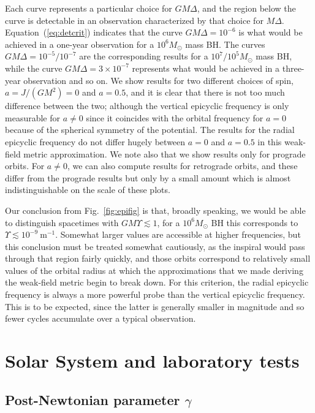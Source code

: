 \documentclass[aps,prd,amsfonts,amssymb,amsmath,nofootinbib,reprint,showpacs]{revtex4-1}
\newcommand{\eqnref}[1]{(\ref{eq:#1})}
\newcommand{\figref}[1]{Fig.\ \ref{fig:#1}}
\newcommand{\units}[1]{\ensuremath{~\mathrm{#1}}}
\begin{document}
Each curve represents a particular choice for $GM\Delta$, and the region below the curve is detectable in an observation characterized by that choice for $M\Delta$. Equation~\eqnref{detcrit} indicates that the curve $GM\Delta = 10^{-6}$ is what would be achieved in a one-year observation for a $10^6M_\odot$ mass BH. The curves $GM\Delta = 10^{-5}/10^{-7}$ are the corresponding results for a $10^7/10^5M_\odot$ mass BH, while the curve $GM\Delta = 3\times10^{-7}$ represents what would be achieved in a three-year observation and so on. We show results for two different choices of spin, $a = J/(GM^2) = 0$ and $a=0.5$, and it is clear that there is not too much difference between the two; although the vertical epicyclic frequency is only measurable for $a \neq 0$ since it coincides with the orbital frequency for $a = 0$ because of the spherical symmetry of the potential. The results for the radial epicyclic frequency do not differ hugely between $a = 0$ and $a = 0.5$ in this weak-field metric approximation. We note also that we show results only for prograde orbits. For $a \neq 0$, we can also compute results for retrograde orbits, and these differ from the prograde results but only by a small amount which is almost indistinguishable on the scale of these plots.

Our conclusion from \figref{epifig} is that, broadly speaking, we would be able to distinguish spacetimes with $GM\Upsilon \lesssim 1 $, for a $10^6 M_\odot$ BH this corresponds to $\Upsilon \lesssim 10^{-9}\units{m^{-1}}$. Somewhat larger values are accessible at higher frequencies, but this conclusion must be treated somewhat cautiously, as the inspiral would pass through that region fairly quickly, and those orbits correspond to relatively small values of the orbital radius at which the approximations that we made deriving the weak-field metric begin to break down. For this criterion, the radial epicyclic frequency is always a more powerful probe than the vertical epicyclic frequency. This is to be expected, since the latter is generally smaller in magnitude and so fewer cycles accumulate over a typical observation.

\section{Solar System and laboratory tests\label{sec:Tests}}

\subsection{Post-Newtonian parameter $\gamma$}
\end{document}

